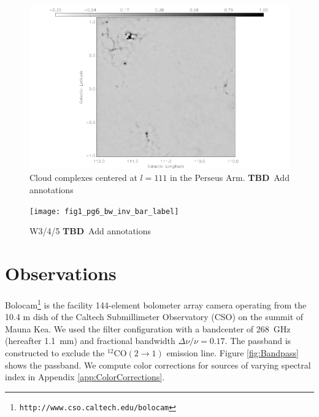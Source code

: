 \documentclass[12pt,preprint]{aastex}
\newcommand{\TBD}{{\bf TBD}}
\begin{document}
\addtocounter{figure}{-1}
\addtocounter{subfig}{1}

\begin{figure}
\hspace{-0.5in}
  \includegraphics[scale=0.8]{fig1_pg4_bw_inv_bar_label} 
  \caption{Cloud complexes centered at $l=111$ in the Perseus Arm. \TBD\ Add annotations}
\end{figure}

\addtocounter{figure}{-1}
\addtocounter{subfig}{1}

\begin{figure}
  \hspace{-1in}
  \texttt{[image: fig1\_pg6\_bw\_inv\_bar\_label]} 
  \caption{W3/4/5 \TBD\ Add annotations}
\end{figure}

\renewcommand{\thefigure}{\arabic{figure}}

\clearpage

\section{Observations}
\label{sec:Observations}

Bolocam\footnote{{\tt http://www.cso.caltech.edu/bolocam}} is the
facility 144-element bolometer array camera operating from the 10.4 m
dish of the Caltech Submillimeter Observatory (CSO) on the summit of
Mauna Kea.  We used the filter configuration with a bandcenter of
268~GHz (hereafter 1.1~mm) and fractional bandwidth $\Delta \nu/\nu =
0.17$.  The passband is constructed to exclude the $^{12}\mathrm{CO}(2
\to 1)$ emission line.  Figure \ref{fig:Bandpass} shows the passband.
We compute color corrections for sources of varying spectral index in
Appendix \ref{app:ColorCorrections}.
\end{document}
